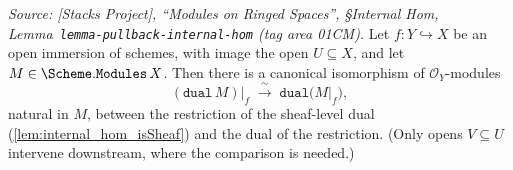 \begin{lemma}





  \label{lem:dual_restrict_iso}
  \textit{Source: [Stacks Project], ``Modules on Ringed Spaces'', \S Internal Hom,
  Lemma~\texttt{lemma-pullback-internal-hom} (tag area 01CM).}
  Let \(f : Y \hookrightarrow X\) be an open immersion of schemes, with image the open
  \(U \subseteq X\), and let \(M \in \Scheme.\mathtt{Modules}\,X\). Then there is a
  canonical isomorphism of \(\mathcal{O}_Y\)-modules
  \[
    (\mathtt{dual}\,M)\big|_f \;\xrightarrow{\ \sim\ }\; \mathtt{dual}\bigl(M|_f\bigr),
  \]
  natural in \(M\), between the restriction of the sheaf-level dual
  (\cref{lem:internal_hom_isSheaf}) and the dual of the restriction. (Only opens
  \(V \subseteq U\) intervene downstream, where the comparison is needed.)
\end{lemma}

